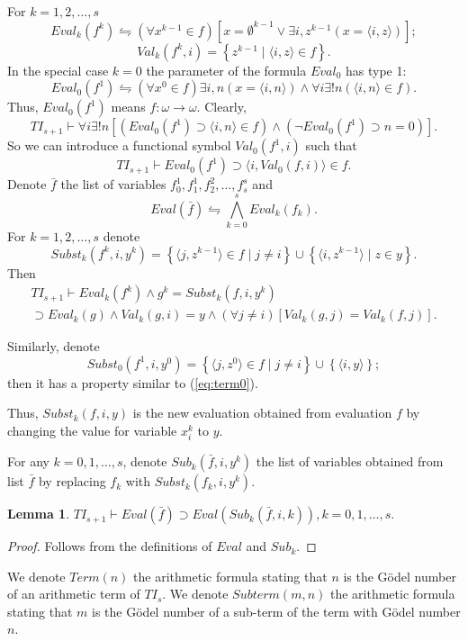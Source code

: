 \documentclass{asl}
\newtheorem{lemma}{Lemma}[section]
\theoremstyle{definition}
\begin{document}
For $k=1, 2,\ldots,s$
\[Eval_k(f^k)\leftrightharpoons \left(\forall x^{k-1}\in f \right)\left[x=\emptyset^{k-1} \vee \exists i, z^{k-1}(x=\langle i,z\rangle)\right]; \]
\[Val_k(f^k,i)=\left\lbrace z^{k-1}\mid \langle i,z\rangle \in f\right\rbrace  .\]
In the special case $k=0$ the parameter of the formula $Eval_0$ has type 1:
\[Eval_0(f^1)\leftrightharpoons \left(\forall x^0\in f \right)\exists i, n (x=\langle i,n\rangle)\wedge \forall i\exists ! n(\langle i,n\rangle \in f).\]
Thus, $Eval_0(f^1)$ means $f:\omega\rightarrow\omega$. Clearly, 
\[TI_{s+1}\vdash \forall i\exists ! n\left[(Eval_0(f^1)\supset\langle i,n\rangle \in f)\wedge(\neg Eval_0(f^1)\supset n=0)\right] .\]
So we can introduce a functional symbol $Val_0(f^1,i)$ such that 
\[TI_{s+1}\vdash Eval_0(f^1)\supset \langle i,Val_0(f,i)\rangle \in f.\]
Denote $\bar{f}$ the list of variables $f_0^1,f_1^1,f_2^2,\ldots,f_s^s$ and 
\[Eval(\bar{f})\leftrightharpoons \bigwedge_{k=0}^s Eval_k(f_k).\] 
For $k=1, 2,\ldots,s$ denote
\[Subst_k(f^k,i,y^k)=\left\lbrace \langle j,z^{k-1}\rangle \in f \mid j\neq i \right\rbrace 
\cup \left\lbrace \langle i,z^{k-1}\rangle \mid z\in y \right\rbrace.\]
Then 
\begin{multline}
TI_{s+1}\vdash Eval_k(f^k)\wedge g^k=Subst_k(f,i,y^k)
\\
\supset Eval_k(g)\wedge Val_k(g,i)=y \wedge (\forall j\neq i)\left[Val_k(g,j)=Val_k(f,j) \right].
\label{eq:term0}
\end{multline}

Similarly, denote
\[Subst_0(f^1,i,y^0)=\left\lbrace \langle j,z^0\rangle \in f \mid j\neq i \right\rbrace 
\cup \left\lbrace \langle i,y\rangle\right\rbrace;\]
then it has a property similar to (\ref{eq:term0}).

Thus, $Subst_k(f,i,y)$ is the new evaluation obtained from evaluation $f$ by changing the value for variable $x_i^k$ to $y$.

For any $k=0,1,\ldots,s$, denote $Sub_k(\bar{f},i,y^k)$ the list of variables obtained from list $\bar{f}$ by replacing $f_k$ with $Subst_k(f_k,i,y^k)$. 
\begin{lemma}
$TI_{s+1}\vdash Eval(\bar{f})\supset Eval(Sub_k(\bar{f},i,k)), k=0,1,\ldots,s.$
\label{lemma:term1}
\end{lemma}
\begin{proof}
Follows from the definitions of $Eval$ and $Sub_k$.
\end{proof}

We denote $Term(n)$ the arithmetic formula stating that $n$ is the G\"{o}del number of an arithmetic term  of $TI_s$. We denote $Subterm(m,n)$ the arithmetic formula stating that $m$ is the G\"{o}del number of a sub-term of the term with G\"{o}del number $n$. 
\end{document}
